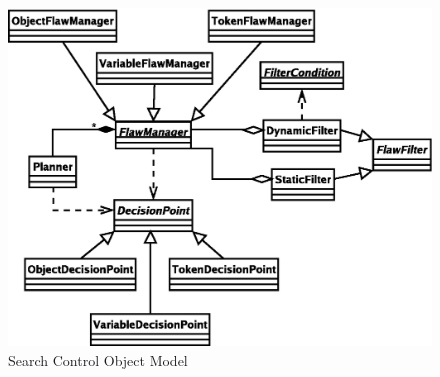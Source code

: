 \documentclass[10pt, letterpaper, oneside]{article}
\begin{document}
\begin{figure}[t]
\includegraphics[scale=0.75]{SearchControl.eps}
\caption{Search Control Object Model}
\label{SearchControlFramework}
\end{figure}
\end{document}
